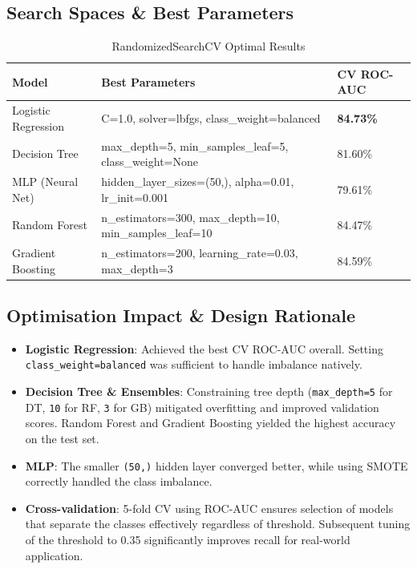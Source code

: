 \documentclass[12pt,a4paper]{article}
\begin{document}
\subsection{Search Spaces \& Best Parameters}

\begin{table}[H]
\centering
\caption{RandomizedSearchCV Optimal Results}
\begin{tabularx}{\textwidth}{llX}
    \toprule
    \textbf{Model} & \textbf{Best Parameters} & \textbf{CV ROC-AUC} \\
    \midrule
    Logistic Regression & C=1.0, solver=lbfgs, class\_weight=balanced & \textbf{84.73\%} \\
    Decision Tree & max\_depth=5, min\_samples\_leaf=5, class\_weight=None & 81.60\% \\
    MLP (Neural Net) & hidden\_layer\_sizes=(50,), alpha=0.01, lr\_init=0.001 & 79.61\% \\
    Random Forest & n\_estimators=300, max\_depth=10, min\_samples\_leaf=10 & 84.47\% \\
    Gradient Boosting & n\_estimators=200, learning\_rate=0.03, max\_depth=3 & 84.59\% \\
    \bottomrule
\end{tabularx}
\end{table}

\subsection{Optimisation Impact \& Design Rationale}

\begin{itemize}[leftmargin=2em]
    \item \textbf{Logistic Regression}: Achieved the best CV ROC-AUC overall. Setting \texttt{class\_weight=balanced} was sufficient to handle imbalance natively.
    \item \textbf{Decision Tree \& Ensembles}: Constraining tree depth (\texttt{max\_depth=5} for DT, \texttt{10} for RF, \texttt{3} for GB) mitigated overfitting and improved validation scores. Random Forest and Gradient Boosting yielded the highest accuracy on the test set.
    \item \textbf{MLP}: The smaller \texttt{(50,)} hidden layer converged better, while using SMOTE correctly handled the class imbalance.
    \item \textbf{Cross-validation}: 5-fold CV using ROC-AUC ensures selection of models that separate the classes effectively regardless of threshold. Subsequent tuning of the threshold to 0.35 significantly improves recall for real-world application.
\end{itemize}
\end{document}
